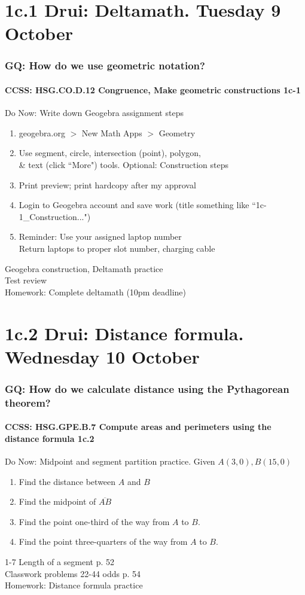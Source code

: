 \documentclass{beamer}
\begin{document}
\section{1c.1 Drui: Deltamath. Tuesday 9 October}
  \frame
  {
    \frametitle{GQ: How do we use geometric notation?}
    \framesubtitle{CCSS: HSG.CO.D.12 Congruence, Make geometric constructions  \alert{1c-1}}

    \begin{block}{Do Now: Write down Geogebra assignment steps}
    \begin{enumerate}
      \item geogebra.org $>$ New Math Apps $>$ Geometry
      \item Use segment, circle, intersection (point), polygon, \\ \& text (click ``More") tools. Optional: Construction steps
      \item Print preview; print hardcopy after my approval
      \item Login to Geogebra account and save work (title something like ``1c-1\_Construction...")
      \item Reminder: Use your assigned laptop number\\
          Return laptops to proper slot number, charging cable
    \end{enumerate}
    \end{block}
    Geogebra construction, Deltamath practice\\
    Test review \\ \bigskip
    Homework: Complete deltamath (10pm deadline)
  }

\section{1c.2 Drui: Distance formula. Wednesday 10 October}
  \frame
  {
    \frametitle{GQ: How do we calculate distance using the Pythagorean theorem?}
    \framesubtitle{CCSS: HSG.GPE.B.7 Compute areas and perimeters using the distance formula  \alert{1c.2}}

    \begin{block}{Do Now: Midpoint and segment partition practice. Given $A(3,0), B(15,0)$}
    \begin{enumerate}
        \item Find the distance between $A$ and $B$
        \item Find the midpoint of $\overline{AB}$
        \item Find the point one-third of the way from $A$ to $B$.
        \item Find the point three-quarters of the way from $A$ to $B$.
    \end{enumerate}
    \end{block}
    1-7 Length of a segment p. 52\\
    Classwork problems 22-44 odds p. 54\\
    \vspace{0.5cm}
    Homework: Distance formula practice
  }
\end{document}
